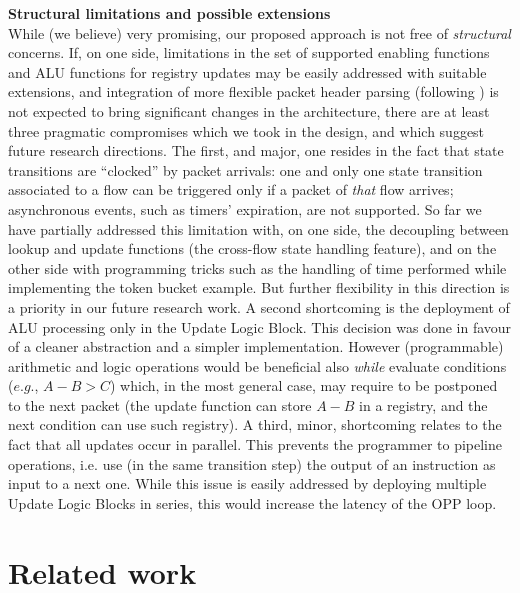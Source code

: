 \documentclass{sig-alternate}
\begin{document}
\vspace{3pt} \noindent \textbf{Structural limitations and possible extensions} \\
While (we believe) very promising, our proposed approach is not free of {\em structural} concerns. If, on one side, limitations in the set of supported enabling functions and ALU functions for registry updates may be easily addressed with suitable extensions, and integration of more flexible packet header parsing (following \cite{Bos14}) is not expected to bring significant changes in the architecture, there are at least three pragmatic compromises which we took in the design, and which suggest future research directions. The first, and major, one resides in the fact that state transitions are ``clocked'' by packet arrivals: one and only one state transition associated to a flow can be triggered only if a packet of {\em that} flow arrives; asynchronous events, such as timers' expiration, are not supported. So far we have partially addressed this limitation with, on one side, the decoupling between lookup and update functions (the cross-flow state handling feature), and on the other side with programming tricks such as the handling of time performed while implementing the token bucket example. But further flexibility in this direction is a priority in our future research work.  A second shortcoming is the deployment of ALU processing only in the Update Logic Block. This decision was done in favour of a cleaner abstraction and a simpler implementation. However (programmable) arithmetic and logic operations would be beneficial also {\em while} evaluate conditions ($e.g.$, $A-B > C$) which, in the most general case, may require to be postponed to the next packet (the update function can store $A-B$ in a registry, and the next condition can use such registry). A third, minor, shortcoming relates to the fact that all updates occur in parallel. This prevents the programmer to pipeline operations, i.e. use (in the same transition step) the output of an instruction as input to a next one. While this issue is easily addressed by deploying multiple Update Logic Blocks in series, this would increase the latency of the OPP loop.




\section{Related work}
\label{s:related}
\end{document}
